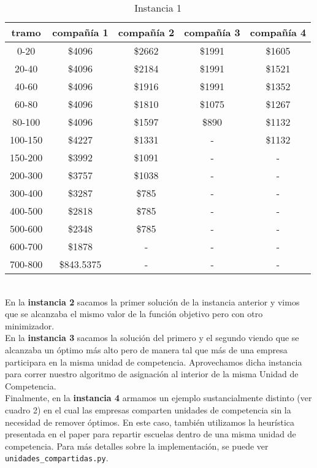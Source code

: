 \documentclass[12pt]{article}
\begin{document}
\begin{table}[h!]
\centering
\begin{tabular}{|| c || c | c | c | c ||}  
 \hline
     tramo & compañía 1 & compañía 2 & compañía 3 & compañía 4 \\ [0.5ex] 
 \hline\hline
 0-20 & \$4096 & \$2662 & \$1991 & \$1605 \\ 
 20-40 & \$4096 & \$2184 & \$1991 & \$1521 \\
 40-60 & \$4096 & \$1916 & \$1991 & \$1352 \\
 60-80 & \$4096 & \$1810 & \$1075 & \$1267 \\
 80-100 & \$4096 & \$1597 & \$890 & \$1132 \\
 100-150 & \$4227 & \$1331 & \-- & \$1132 \\
 150-200 & \$3992 & \$1091 & \-- & \-- \\
 200-300 & \$3757 & \$1038 & \-- & \-- \\
 300-400 & \$3287 & \$785 & \-- & \-- \\
 400-500 & \$2818 & \$785 & \-- & \-- \\
 500-600 & \$2348 & \$785 & \-- & \-- \\
 600-700 & \$1878 & \-- & \-- & \-- \\
 700-800 & \$843.5375 & \-- & \-- & \-- \\ [1ex] 
 \hline
\end{tabular}
\caption{Instancia 1}
\label{table:1}
\end{table}

\\
En la \textbf{instancia 2} sacamos la primer solución de la instancia anterior y vimos que se alcanzaba el mismo valor de la función objetivo pero con otro minimizador.
\\
En la \textbf{instancia 3} sacamos la solución del primero y el segundo viendo que se alcanzaba un óptimo más alto pero de manera tal que más de una empresa participara en la misma unidad de competencia. Aprovechamos dicha instancia para correr nuestro algoritmo de asignación al interior de la misma Unidad de Competencia.
\\
Finalmente, en la \textbf{instancia 4} armamos un ejemplo sustancialmente distinto (ver cuadro 2) en el cual las empresas comparten unidades de competencia sin la necesidad de remover óptimos. En este caso, también utilizamos la heurística presentada en el paper para repartir escuelas dentro de una misma unidad de competencia. Para más detalles sobre la implementación, se puede ver \texttt{unidades\_compartidas.py}.
\end{document}
